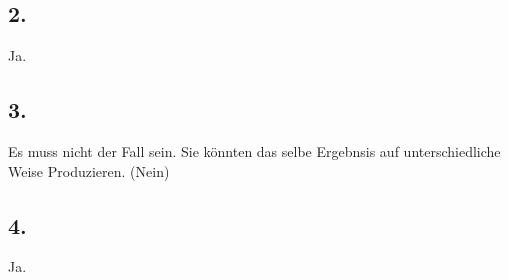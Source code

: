 \documentclass[a4paper]{report}
\begin{document}
\subsection*{2.}
Ja.
\subsection*{3.}
Es muss nicht der Fall sein. Sie könnten das selbe Ergebnsis auf unterschiedliche Weise Produzieren. (Nein)
\subsection*{4.}
Ja.
\end{document}
